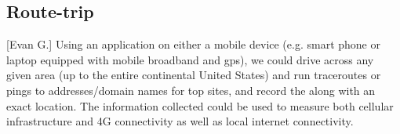\subsection{Route-trip}[Evan G.]
Using an application on either a mobile device (e.g. smart phone or laptop equipped with mobile broadband and \acrshort{gps}), we could drive across any given area (up to the entire continental United States) and run traceroutes or pings to \ip addresses/domain names for top sites, and record the \rtt along with an exact location. The information collected could be used to measure both cellular infrastructure and 4G connectivity as well as local internet connectivity.
